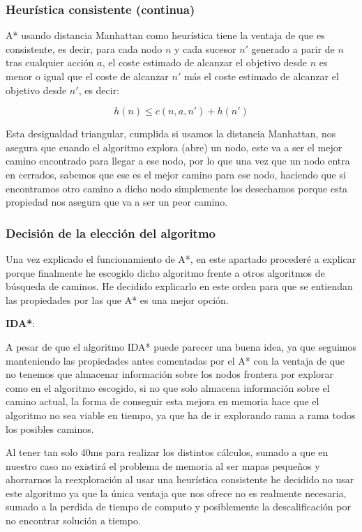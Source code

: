 \documentclass[10pt, spanish]{article}
\begin{document}
\subsubsection{Heurística consistente (continua)}

A* usando distancia Manhattan como heurística tiene la ventaja de que es consistente, es decir, para cada nodo $n$ y cada sucesor $n'$ generado a parir de $n$ tras cualquier acción $a$, el coste estimado de alcanzar el objetivo desde $n$ es menor o igual que el coste de alcanzar $n'$ más el coste estimado de alcanzar el objetivo desde $n'$, es decir:

$$ h(n) \leq c(n, a, n') + h(n') $$

Esta desigualdad triangular, cumplida si usamos la distancia Manhattan, nos asegura que cuando el algoritmo explora (abre) un nodo, este va a ser el mejor camino encontrado para llegar a ese nodo, por lo que una vez que un nodo entra en cerrados, sabemos que ese es el mejor camino para ese nodo, haciendo que si encontramos otro camino a dicho nodo simplemente los desechamos porque esta propiedad nos asegura que va a ser un peor camino.


\subsubsection{Decisión de la elección del algoritmo}

Una vez explicado el funcionamiento de A*, en este apartado procederé a explicar porque finalmente he escogido dicho algoritmo frente a otros algoritmos de búsqueda de caminos. He decidido explicarlo en este orden para que se entiendan las propiedades por las que A* es una mejor opción.

\textbf{IDA*}:

A pesar de que el algoritmo IDA* puede parecer una buena idea, ya que seguimos manteniendo las propiedades antes comentadas por el A* con la ventaja de que no tenemos que almacenar información sobre los nodos frontera por explorar como en el algoritmo escogido, si no que solo almacena información sobre el camino actual, la forma de conseguir esta mejora en memoria hace que el algoritmo no sea viable en tiempo, ya que ha de ir explorando rama a rama todos los posibles caminos.

Al tener tan solo 40ms para realizar los distintos cálculos, sumado a que en nuestro caso no existirá el problema de memoria al ser mapas pequeños y ahorrarnos la reexploración al usar una heurística consistente he decidido no usar este algoritmo ya que la única ventaja que nos ofrece no es realmente necesaria, sumado a la perdida de tiempo de computo y posiblemente la descalificación por no encontrar solución a tiempo.
\end{document}

